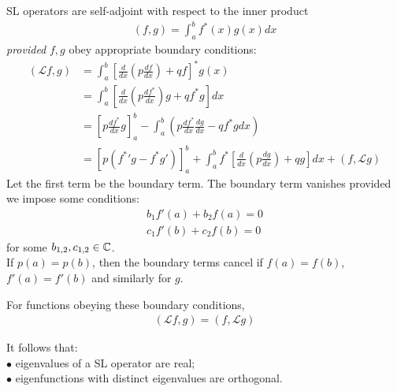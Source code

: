 \documentclass[a4paper]{article}
\begin{document}
SL operators are self-adjoint with respect to the inner product
\begin{equation*}
\begin{aligned}
\left(f,g\right) = \int_a^b f^* \left(x\right) g\left(x\right) dx
\end{aligned}
\end{equation*}
\emph{provided} $f,g$ obey appropriate boundary conditions:
\begin{equation*}
\begin{aligned}
\left(\mathcal{L}f,g\right) &= \int_a^b \left[\frac{d}{dx}\left(p\frac{df}{dx}\right) + qf\right]^* g\left(x\right) \\
&= \int_a^b \left[\frac{d}{dx} \left(p\frac{df^*}{dx}\right) g + q f^* g\right] dx\\
&= \left[p \frac{df^*}{dx} g\right]_a^b - \int_a^b \left(p \frac{df^*}{dx} \frac{dg}{dx} - qf^* g dx\right)\\
&= \left[p\left(\left.f^{*}\right.' g - f^* g'\right) \right]_a^b + \int_a^b f^* \left[\frac{d}{dx} \left(p\frac{dg}{dx}\right) + qg\right] dx + \left(f,\mathcal{L}g\right)
\end{aligned}
\end{equation*}
Let the first term be the boundary term. The boundary term vanishes provided we impose some conditions:
\begin{equation*}
\begin{aligned}
b_1 f'\left(a\right) + b_2 f\left(a\right) = 0\\
c_1 f'\left(b\right) + c_2 f\left(b\right) = 0
\end{aligned}
\end{equation*}
for some $b_{1,2}, c_{1,2} \in \mathbb{C}$.\\
If $p\left(a\right) = p\left(b\right)$, then the boundary terms cancel if $f\left(a\right) = f\left(b\right)$, $f'\left(a\right) = f'\left(b\right)$ and similarly for $g$.

For functions obeying these boundary conditions,
\begin{equation*}
\begin{aligned}
\left(\mathcal{L}f,g\right) = \left(f,\mathcal{L}g\right)
\end{aligned}
\end{equation*}

It follows that:\\
$\bullet$ eigenvalues of a SL operator are real;\\
$\bullet$ eigenfunctions with distinct eigenvalues are orthogonal.
\end{document}
